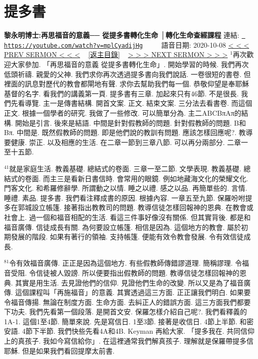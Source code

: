 \documentclass{book}
\begin{document}
\section{提多書}
\label{sec:mplCyadijHg}
\textbf{黎永明博士:再思福音的意義── 從提多書轉化生命 │轉化生命查經課程}
\newline
\newline
連結: \href{https://youtube.com/watch?v=mplCyadijHg}{\texttt{ https://youtube.com/watch?v=mplCyadijHg}} ~~~~ 語音日期: 2020-10-08 
\newline
\newline
\hyperref[sec:D_owA__iQKw]{\small{< < < PREV SERMON < < <}}
~
\hyperref[sec:index]{\small{[返主目錄]}}
~
\hyperref[sec:WaZJ_SUMkxc]{\small{> > > NEXT SERMON > > >}}
\newline
\newline
$^{1}$再次歡迎大家參加.
「再思福音的意義 從提多書轉化生命」.
開始學習的時候.
我們再次低頭祈禱.
親愛的父神.
我們求你再次透過提多書向我們說話.
一卷很短的書卷.
但裡面的訊息對歷代的教會都閘地有聲.
求你去幫助我們每一個.
恭敬仰望是奉耶穌基督的名字.
看我們的講義第一頁.
提多書有三章.
加起來只有46節.
不是很長.
我們先看導覽.
主一是傳書結構.
開首文案.
正文.
結束文案.
三分法去看書卷.
而這個正文.
根據一個學者的研究.
我做了一些修改.
可以簡單分為.
主二ABCBπAπ的結構.
開始是引言.
後來是結語.
中間是針對假教師的問題.
針對假教師的問題.
B和Bπ.
中間是.
既然假教師的問題.
即是他們說的教訓有問題.
應該怎樣回應呢?.
教導要健康.
崇正.
以及相應的生活.
在二章一節到三章八節.
可以再分兩部分.
二章一至十五節.

$^{41}$就是家庭生活.
教義基礎.
總結式的卷面.
三章一至二節.
文學表現.
教義基礎.
總結式的卷面.
而主三是看新日書信時.
會常用的眼鏡.
例如地藏海文化的榮耀文化.
門客文化.
和希羅修辭學.
所謂動之以情.
睡之以禮.
感之以品.
再簡單些的.
言情.
睡禮.
素品.
提多書.
我們看注釋成書的原因.
根據內容.
一章五至九節.
保羅吩咐提多在郭城設立帳篷.
接著指出教教司的問題.
教導信徒怎樣回報神的恩典.
在教會或社會上.
過一個和福音相配的生活.
看這三件事好像沒有關係.
但其實背後.
都是和福音廣傳.
信徒成長有關.
為何要設立帳篷.
相信是因為.
這個地方的教會.
屬於初期發展的階段.
如果有著行的領袖.
支持帳篷.
便能有效令教會發展.
令有效信徒成長.

$^{81}$令有效福音廣傳.
正正是因為這個地方.
有些假教師傳錯謬道理.
簡稱謬理.
令福音受阻.
令信徒被人毀謗.
所以便要指出假教師的問題.
教導信徒怎樣回報神的恩典.
其實是用生活.
去見證他們的信仰.
見證他們生命的改變.
所以又是為了福音廣傳.
這個課程叫「再施福音」的意義.
其實透過這三方面.
正正讓我們明白.
如果要令福音傳揚.
無論在制度方面.
生命方面.
去糾正人的錯誤方面.
這三方面我們都要下功夫.
我們先看第一個段落.
是開首文安.
保羅怎樣介紹自己呢?.
我們看釋義的1A-1.
這個1至4節.
簡單來說.
先是寫信日.
1至3節.
接著是收信日.
4節上半節.
和密安語.
4節下半節.
我們快些先看4A和4B.
Keyman 再給大家.
「提多我在.
共同信仰上的真孩子.
我如今寫信給你」.
在這裡通常我們解真孩子.
理解就是保羅帶提多信耶穌.
但是如果我們看回提摩太前書.
\end{document}
